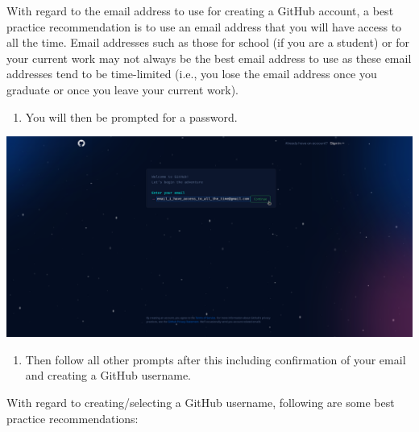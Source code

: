 \documentclass[
  12pt,
]{book}
\providecommand{\tightlist}{%
  \setlength{\itemsep}{0pt}\setlength{\parskip}{0pt}}
\begin{document}
With regard to the email address to use for creating a GitHub account, a best practice recommendation is to use an email address that you will have access to all the time. Email addresses such as those for school (if you are a student) or for your current work may not always be the best email address to use as these email addresses tend to be time-limited (i.e., you lose the email address once you graduate or once you leave your current work).

\begin{enumerate}
\def\labelenumi{\arabic{enumi}.}
\setcounter{enumi}{3}
\tightlist
\item
  You will then be prompted for a password.
\end{enumerate}

\includegraphics{images/github_account2.png}

\begin{enumerate}
\def\labelenumi{\arabic{enumi}.}
\setcounter{enumi}{4}
\tightlist
\item
  Then follow all other prompts after this including confirmation of your email and creating a GitHub username.
\end{enumerate}

With regard to creating/selecting a GitHub username, following are some best practice recommendations:
\end{document}
